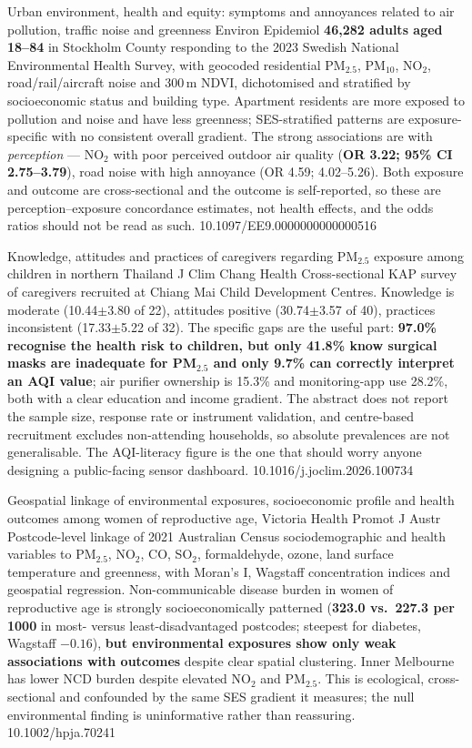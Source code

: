 \documentclass[10pt]{article}
\begin{document}
{Urban environment, health and equity: symptoms and annoyances related to air pollution,
traffic noise and greenness}
{Environ Epidemiol}
{\textbf{46{,}282 adults aged 18--84} in Stockholm County responding to the 2023 Swedish
National Environmental Health Survey, with geocoded residential PM$_{2.5}$, PM$_{10}$,
NO$_2$, road/rail/aircraft noise and 300\,m NDVI, dichotomised and stratified by
socioeconomic status and building type. Apartment residents are more exposed to pollution
and noise and have less greenness; SES-stratified patterns are exposure-specific with no
consistent overall gradient. The strong associations are with \emph{perception} --- NO$_2$
with poor perceived outdoor air quality (\textbf{OR 3.22; 95\% CI 2.75--3.79}), road noise
with high annoyance (OR 4.59; 4.02--5.26). Both exposure and outcome are cross-sectional
and the outcome is self-reported, so these are perception--exposure concordance
estimates, not health effects, and the odds ratios should not be read as such.}
{10.1097/EE9.0000000000000516}

{Knowledge, attitudes and practices of caregivers regarding PM$_{2.5}$ exposure among
children in northern Thailand}
{J Clim Chang Health}
{Cross-sectional KAP survey of caregivers recruited at Chiang Mai Child Development
Centres. Knowledge is moderate (10.44$\pm$3.80 of 22), attitudes positive
(30.74$\pm$3.57 of 40), practices inconsistent (17.33$\pm$5.22 of 32). The specific gaps
are the useful part: \textbf{97.0\% recognise the health risk to children, but only
41.8\% know surgical masks are inadequate for PM$_{2.5}$ and only 9.7\% can correctly
interpret an AQI value}; air purifier ownership is 15.3\% and monitoring-app use 28.2\%,
both with a clear education and income gradient. The abstract does not report the sample
size, response rate or instrument validation, and centre-based recruitment excludes
non-attending households, so absolute prevalences are not generalisable. The AQI-literacy
figure is the one that should worry anyone designing a public-facing sensor dashboard.}
{10.1016/j.joclim.2026.100734}

{Geospatial linkage of environmental exposures, socioeconomic profile and health outcomes
among women of reproductive age, Victoria}
{Health Promot J Austr}
{Postcode-level linkage of 2021 Australian Census sociodemographic and health variables to
PM$_{2.5}$, NO$_2$, CO, SO$_2$, formaldehyde, ozone, land surface temperature and
greenness, with Moran's I, Wagstaff concentration indices and geospatial regression.
Non-communicable disease burden in women of reproductive age is strongly socioeconomically
patterned (\textbf{323.0 vs.\ 227.3 per 1000} in most- versus least-disadvantaged
postcodes; steepest for diabetes, Wagstaff $-0.16$), \textbf{but environmental exposures
show only weak associations with outcomes} despite clear spatial clustering. Inner
Melbourne has lower NCD burden despite elevated NO$_2$ and PM$_{2.5}$. This is
ecological, cross-sectional and confounded by the same SES gradient it measures; the
null environmental finding is uninformative rather than reassuring.}
{10.1002/hpja.70241}
\end{document}

